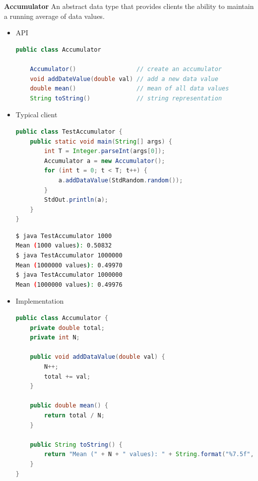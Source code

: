 \documentclass[8pt,a4paper,compress]{beamer}
\begin{document}
\begin{frame}[fragile]
\pause

\textbf{Accumulator} An abstract data type that provides clients the ability to maintain a running average of data values.
\begin{itemize}
\item API
\begin{lstlisting}[language=Java]
public class Accumulator

    Accumulator()                 // create an accumulator
    void addDateValue(double val) // add a new data value
    double mean()                 // mean of all data values
    String toString()             // string representation
\end{lstlisting}

\pause
\item Typical client
\begin{lstlisting}[language=Java]
public class TestAccumulator {
    public static void main(String[] args) {
        int T = Integer.parseInt(args[0]);
        Accumulator a = new Accumulator();
        for (int t = 0; t < T; t++) {
            a.addDataValue(StdRandom.random());
        }
        StdOut.println(a);
    }
}
\end{lstlisting}

\begin{lstlisting}[language=bash]
$ java TestAccumulator 1000
Mean (1000 values): 0.50832
$ java TestAccumulator 1000000
Mean (1000000 values): 0.49970
$ java TestAccumulator 1000000
Mean (1000000 values): 0.49976
\end{lstlisting}
\end{itemize}
\end{frame}

\begin{frame}[fragile]
\pause

\begin{itemize}
\item Implementation
\begin{lstlisting}[language=Java]
public class Accumulator {
    private double total;
    private int N;

    public void addDataValue(double val) {
        N++;
        total += val;
    }

    public double mean() {
        return total / N;
    }

    public String toString() {
        return "Mean (" + N + " values): " + String.format("%7.5f", mean());
    }
}
\end{lstlisting}
\end{itemize}
\end{frame}
\end{document}
